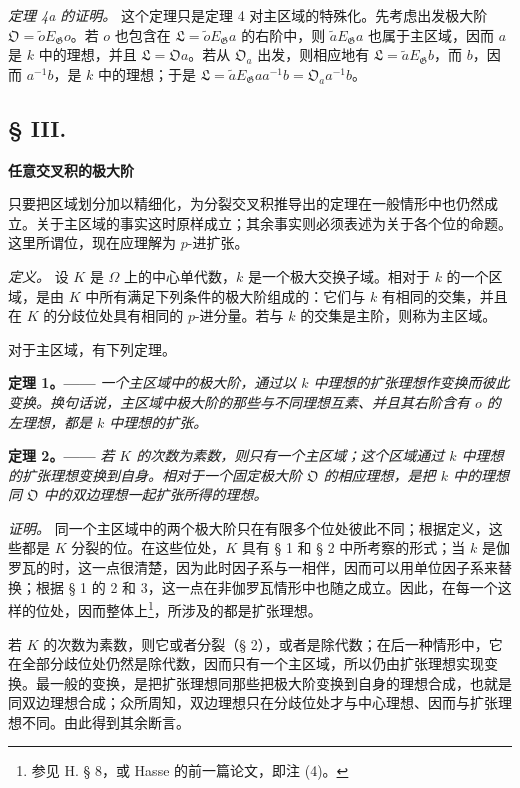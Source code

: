 \documentclass[11pt]{article}
\providecommand{\Gg}{\mathfrak G}
\begin{document}
\medskip
\noindent\emph{定理 4a 的证明。} 这个定理只是定理 4 对主区域的特殊化。先考虑出发极大阶 \(\mathfrak O=\widetilde oE_\Gg o\)。若 \(o\) 也包含在 \(\mathfrak L=\widetilde oE_\Gg a\) 的右阶中，则 \(\widetilde aE_\Gg a\) 也属于主区域，因而 \(a\) 是 \(k\) 中的理想，并且 \(\mathfrak L=\mathfrak Oa\)。若从 \(\mathfrak O_a\) 出发，则相应地有 \(\mathfrak L=\widetilde aE_\Gg b\)，而 \(b\)，因而 \(a^{-1}b\)，是 \(k\) 中的理想；于是
\(\mathfrak L=\widetilde aE_\Gg aa^{-1}b=\mathfrak O_a a^{-1}b\)。

\subsection*{§ III.}
\begin{center}
\textbf{任意交叉积的极大阶}
\end{center}

只要把区域划分加以精细化，为分裂交叉积推导出的定理在一般情形中也仍然成立。关于主区域的事实这时原样成立；其余事实则必须表述为关于各个位的命题。这里所谓位，现在应理解为 \(p\)-进扩张。

\emph{定义。} 设 \(K\) 是 \(\Omega\) 上的中心单代数，\(k\) 是一个极大交换子域。相对于 \(k\) 的一个区域，是由 \(K\) 中所有满足下列条件的极大阶组成的：它们与 \(k\) 有相同的交集，并且在 \(K\) 的分歧位处具有相同的 \(p\)-进分量。若与 \(k\) 的交集是主阶，则称为主区域。

对于主区域，有下列定理。

\medskip
\noindent\textbf{定理 1。——} \emph{一个主区域中的极大阶，通过以 \(k\) 中理想的扩张理想作变换而彼此变换。换句话说，主区域中极大阶的那些与不同理想互素、并且其右阶含有 \(o\) 的左理想，都是 \(k\) 中理想的扩张。}

\medskip
\noindent\textbf{定理 2。——} \emph{若 \(K\) 的次数为素数，则只有一个主区域；这个区域通过 \(k\) 中理想的扩张理想变换到自身。相对于一个固定极大阶 \(\mathfrak O\) 的相应理想，是把 \(k\) 中的理想同 \(\mathfrak O\) 中的双边理想一起扩张所得的理想。}

\emph{证明。} 同一个主区域中的两个极大阶只在有限多个位处彼此不同；根据定义，这些都是 \(K\) 分裂的位。在这些位处，\(K\) 具有 § 1 和 § 2 中所考察的形式；当 \(k\) 是伽罗瓦的时，这一点很清楚，因为此时因子系与一相伴，因而可以用单位因子系来替换；根据 § 1 的 2 和 3，这一点在非伽罗瓦情形中也随之成立。因此，在每一个这样的位处，因而整体上\footnote{参见 H. § 8，或 Hasse 的前一篇论文，即注 (4)。}，所涉及的都是扩张理想。

若 \(K\) 的次数为素数，则它或者分裂（§ 2），或者是除代数；在后一种情形中，它在全部分歧位处仍然是除代数，因而只有一个主区域，所以仍由扩张理想实现变换。最一般的变换，是把扩张理想同那些把极大阶变换到自身的理想合成，也就是同双边理想合成；众所周知，双边理想只在分歧位处才与中心理想、因而与扩张理想不同。由此得到其余断言。
\end{document}
